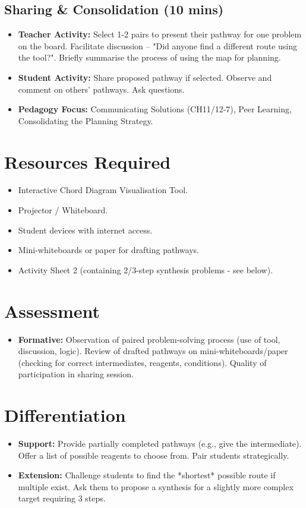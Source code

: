 \documentclass[11pt, a4paper]{article}
\begin{document}
\subsection*{Sharing & Consolidation (10 mins)}
\begin{itemize}
    \item \textbf{Teacher Activity:} Select 1-2 pairs to present their pathway for one problem on the board. Facilitate discussion – "Did anyone find a different route using the tool?". Briefly summarise the process of using the map for planning.
    \item \textbf{Student Activity:} Share proposed pathway if selected. Observe and comment on others' pathways. Ask questions.
    \item \textbf{Pedagogy Focus:} Communicating Solutions (CH11/12-7), Peer Learning, Consolidating the Planning Strategy.
\end{itemize}

\section*{Resources Required}
\begin{itemize}
    \item Interactive Chord Diagram Visualisation Tool.
    \item Projector / Whiteboard.
    \item Student devices with internet access.
    \item Mini-whiteboards or paper for drafting pathways.
    \item Activity Sheet 2 (containing 2/3-step synthesis problems - see below).
\end{itemize}

\section*{Assessment}
\begin{itemize}
    \item \textbf{Formative:} Observation of paired problem-solving process (use of tool, discussion, logic). Review of drafted pathways on mini-whiteboards/paper (checking for correct intermediates, reagents, conditions). Quality of participation in sharing session.
\end{itemize}

\section*{Differentiation}
\begin{itemize}
    \item \textbf{Support:} Provide partially completed pathways (e.g., give the intermediate). Offer a list of possible reagents to choose from. Pair students strategically.
    \item \textbf{Extension:} Challenge students to find the *shortest* possible route if multiple exist. Ask them to propose a synthesis for a slightly more complex target requiring 3 steps.
\end{itemize}
\end{document}
